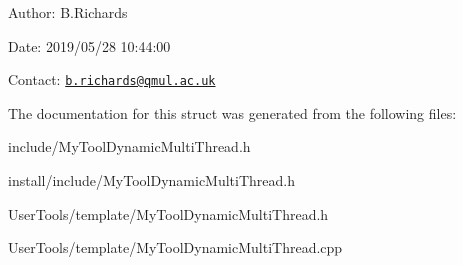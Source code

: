 \begin{DoxyParagraph}{Author\-:}
B.\-Richards 
\end{DoxyParagraph}
\begin{DoxyParagraph}{Date\-:}
2019/05/28 10\-:44\-:00 
\end{DoxyParagraph}
Contact\-: \href{mailto:b.richards@qmul.ac.uk}{\tt b.\-richards@qmul.\-ac.\-uk} 

The documentation for this struct was generated from the following files\-:\begin{DoxyCompactItemize}
\item 
include/My\-Tool\-Dynamic\-Multi\-Thread.\-h\item 
install/include/My\-Tool\-Dynamic\-Multi\-Thread.\-h\item 
User\-Tools/template/My\-Tool\-Dynamic\-Multi\-Thread.\-h\item 
User\-Tools/template/My\-Tool\-Dynamic\-Multi\-Thread.\-cpp\end{DoxyCompactItemize}
